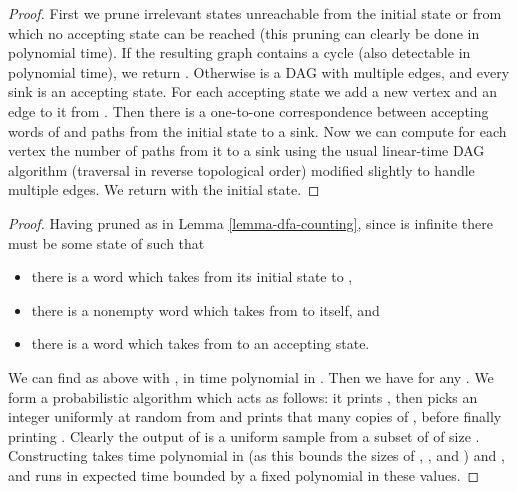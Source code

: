 \documentclass[a4paper,USenglish,numberwithinsect]{lipics}
\theoremstyle{plain}
\theoremstyle{definition}
\begin{document}
\lemmaDFACounting*
\begin{proof}
First we prune irrelevant states unreachable from the initial state or from which no accepting state can be reached (this pruning can clearly be done in polynomial time). If the resulting graph contains a cycle (also detectable in polynomial time), we return . Otherwise  is a DAG with multiple edges, and every sink is an accepting state. For each accepting state  we add a new vertex and an edge to it from . Then there is a one-to-one correspondence between accepting words of  and paths from the initial state to a sink. Now we can compute for each vertex  the number of paths  from it to a sink using the usual linear-time DAG algorithm (traversal in reverse topological order) modified slightly to handle multiple edges. We return  with  the initial state.
\end{proof}

\lemmaDFAPumpSamp*
\begin{proof}
Having pruned  as in Lemma \ref{lemma-dfa-counting}, since  is infinite there must be some state  of  such that
\begin{itemize}
\item there is a word  which takes  from its initial state to ,
\item there is a nonempty word  which takes  from  to itself, and
\item there is a word  which takes  from  to an accepting state.
\end{itemize}
We can find  as above with , in time polynomial in . Then we have  for any . We form a probabilistic algorithm  which acts as follows: it prints , then picks an integer uniformly at random from  and prints that many copies of , before finally printing . Clearly the output of  is a uniform sample from a subset of  of size . Constructing  takes time polynomial in  (as this bounds the sizes of , , and ) and , and  runs in expected time bounded by a fixed polynomial in these values.
\end{proof}
\end{document}
